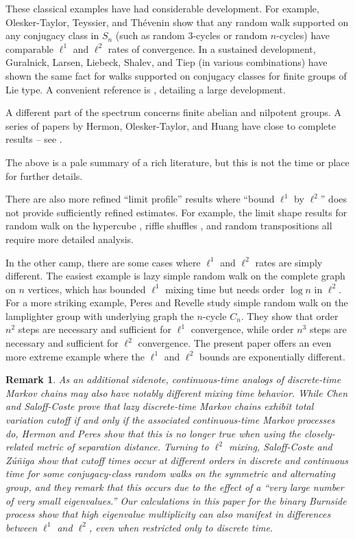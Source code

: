 \documentclass[11pt]{article}
\newcounter{r}
\newcounter{s}
\numberwithin{equation}{section}
\newtheorem*{remark}{Remark}
\begin{document}
These classical examples have had considerable development. For example, Olesker-Taylor, Teyssier, and Th\'evenin \cite{comparablel1l2conjugacy} show that any random walk supported on any conjugacy class in $S_n$ (such as random $3$-cycles or random $n$-cycles) have comparable $\ell^1$ and $\ell^2$ rates of convergence. In a sustained development, Guralnick, Larsen, Liebeck, Shalev, and Tiep (in various combinations) have shown the same fact for walks supported on conjugacy classes for finite groups of Lie type. A convenient reference is \cite{characterlietype}, detailing a large development.

A different part of the spectrum concerns finite abelian and nilpotent groups. A series of papers by Hermon, Olesker-Taylor, and Huang have close to complete results -- see \cite{hermontaylor, hermonhuang}.

The above is a pale summary of a rich literature, but this is not the time or place for further details.

There are also more refined ``limit profile'' results where ``bound $\ell^1$ by $\ell^2$'' does not provide sufficiently refined estimates. For example, the limit shape results for random walk on the hypercube \cite{nearestneighbor}, riffle shuffles \cite{riffleshuffle}, and random transpositions \cite{teyssierlimitprofile} all require more detailed analysis. 

In the other camp, there are some cases where $\ell^1$ and $\ell^2$ rates are simply different. The easiest example is lazy simple random walk on the complete graph on $n$ vertices, which has bounded $\ell^1$ mixing time but needs order $\log n$ in $\ell^2$. For a more striking example, Peres and Revelle \cite{lamplighter} study simple random walk on the lamplighter group with underlying graph the $n$-cycle $C_n$. They show that order $n^2$ steps are necessary and sufficient for $\ell^1$ convergence, while order $n^3$ steps are necessary and sufficient for $\ell^2$ convergence. The present paper offers an even more extreme example where the $\ell^1$ and $\ell^2$ bounds are exponentially different.

\begin{remark}
As an additional sidenote, continuous-time analogs of discrete-time Markov chains may also have notably different mixing time behavior. While Chen and Saloff-Coste \cite{chensaloffcoste} prove that lazy discrete-time Markov chains exhibit total variation cutoff if and only if the associated continuous-time Markov processes do, Hermon and Peres \cite{hermonperes} show that this is no longer true when using the closely-related metric of \textit{separation distance}. Turning to $\ell^2$ mixing, Saloff-Coste and Z\'u\~niga \cite{zuniga} show that cutoff times occur at different orders in discrete and continuous time for some conjugacy-class random walks on the symmetric and alternating group, and they remark that this occurs due to the effect of a ``very large number of very small eigenvalues.'' Our calculations in this paper for the binary Burnside process show that high eigenvalue multiplicity can also manifest in differences between $\ell^1$ and $\ell^2$, even when restricted only to discrete time.
\end{remark}
\end{document}
